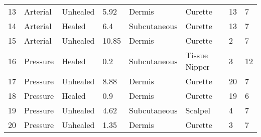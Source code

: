 \begin{table}[]
\begin{tabular}{llllllll}
13         & Arterial   & Unhealed        & 5.92                & Dermis               & Curette       & 13                        & 7                            \\
14         & Arterial   & Healed          & 6.4                 & Subcutaneous         & Curette       & 13                        & 7                            \\
15         & Arterial   & Unhealed        & 10.85               & Dermis               & Curette       & 2                         & 7                            \\
16         & Pressure   & Healed          & 0.2                 & Subcutaneous         & Tissue Nipper & 3                         & 12                           \\
17         & Pressure   & Unhealed        & 8.88                & Dermis               & Curette       & 20                        & 7                            \\
18         & Pressure   & Healed          & 0.9                 & Dermis               & Curette       & 19                        & 6                            \\
19         & Pressure   & Unhealed        & 4.62                & Subcutaneous         & Scalpel       & 4                         & 7                            \\
20         & Pressure   & Unhealed        & 1.35                & Dermis               & Curette       & 3                         & 7                           
\end{tabular}
\end{table}